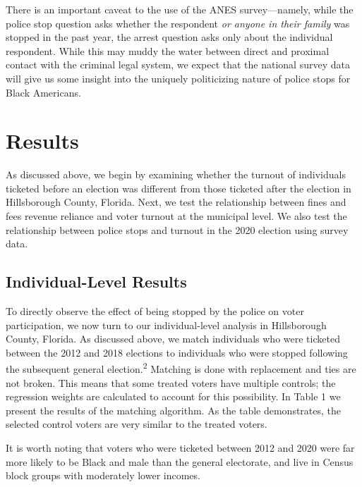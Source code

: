 \documentclass[
  12pt,
]{article}
\begin{document}
There is an important caveat to the use of the ANES survey---namely, while the police stop question asks whether the respondent \emph{or anyone in their family} was stopped in the past year, the arrest question asks only about the individual respondent. While this may muddy the water between direct and proximal contact with the criminal legal system, we expect that the national survey data will give us some insight into the uniquely politicizing nature of police stops for Black Americans.

\hypertarget{results}{%
\section*{Results}\label{results}}

As discussed above, we begin by examining whether the turnout of individuals ticketed before an election was different from those ticketed after the election in Hillsborough County, Florida.
Next, we test the relationship between fines and fees revenue reliance and voter turnout at the municipal level. We also test the relationship between police stops and turnout in the 2020 election using survey data.

\hypertarget{individual-level-results}{%
\subsection*{Individual-Level Results}\label{individual-level-results}}

To directly observe the effect of being stopped by the police on voter participation, we now turn to our individual-level analysis in Hillsborough County, Florida. As discussed above, we match individuals who were ticketed between the 2012 and 2018 elections to individuals who were stopped following the subsequent general election.\textsuperscript{2} Matching is done with replacement and ties are not broken. This means that some treated voters have multiple controls; the regression weights are calculated to account for this possibility. In Table 1 we present the results of the matching algorithm. As the table demonstrates, the selected control voters are very similar to the treated voters.

\begin{singlespace}

\end{singlespace}

It is worth noting that voters who were ticketed between 2012 and 2020 were far more likely to be Black and male than the general electorate, and live in Census block groups with moderately lower incomes.
\end{document}
